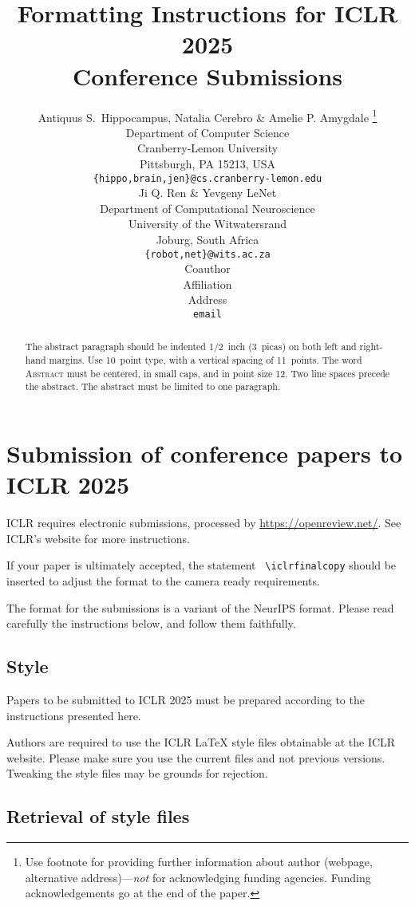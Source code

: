 \documentclass{article} %
\title{Formatting Instructions for ICLR 2025 \\ Conference Submissions}
\author{Antiquus S.~Hippocampus, Natalia Cerebro \& Amelie P. Amygdale \thanks{ Use footnote for providing further information
about author (webpage, alternative address)---\emph{not} for acknowledging
funding agencies.  Funding acknowledgements go at the end of the paper.} \\
Department of Computer Science\\
Cranberry-Lemon University\\
Pittsburgh, PA 15213, USA \\
\texttt{\{hippo,brain,jen\}@cs.cranberry-lemon.edu} \\
\And
Ji Q. Ren \& Yevgeny LeNet \\
Department of Computational Neuroscience \\
University of the Witwatersrand \\
Joburg, South Africa \\
\texttt{\{robot,net\}@wits.ac.za} \\
\AND
Coauthor \\
Affiliation \\
Address \\
\texttt{email}
}
\begin{document}
\maketitle

\begin{abstract}
The abstract paragraph should be indented 1/2~inch (3~picas) on both left and
right-hand margins. Use 10~point type, with a vertical spacing of 11~points.
The word \textsc{Abstract} must be centered, in small caps, and in point size 12. Two
line spaces precede the abstract. The abstract must be limited to one
paragraph.
\end{abstract}

\section{Submission of conference papers to ICLR 2025}

ICLR requires electronic submissions, processed by
\url{https://openreview.net/}. See ICLR's website for more instructions.

If your paper is ultimately accepted, the statement {\tt
  {\textbackslash}iclrfinalcopy} should be inserted to adjust the
format to the camera ready requirements.

The format for the submissions is a variant of the NeurIPS format.
Please read carefully the instructions below, and follow them
faithfully.

\subsection{Style}

Papers to be submitted to ICLR 2025 must be prepared according to the
instructions presented here.


Authors are required to use the ICLR \LaTeX{} style files obtainable at the
ICLR website. Please make sure you use the current files and
not previous versions. Tweaking the style files may be grounds for rejection.

\subsection{Retrieval of style files}
\end{document}
